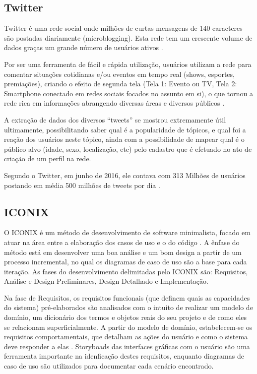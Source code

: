 \documentclass[
	12pt,				%
	openright,			%
	oneside,			%
	a4paper,			%
	english,			%
	spanish,			%
	brazil				%
	]{abntex2}
\begin{document}
	\subsection{Twitter}
	
	Twitter é uma rede social onde milhões de curtas mensagens de 140 caracteres são postadas diariamente (microblogging). Esta rede tem um crescente volume de dados graças um grande número de usuários ativos \cite{conference_twitter_alg}.

	Por ser uma ferramenta de fácil e rápida utilização, usuários utilizam a rede para comentar situações cotidianas e/ou eventos em tempo real (shows, esportes, premiações), criando o efeito de segunda tela (Tela 1: Evento ou TV, Tela 2: Smartphone conectado em redes sociais focados no assunto em si), o que tornou a rede rica em informações abrangendo diversas áreas e diversos públicos \cite{conference_twitter_sports}.

	A extração de dados dos diversos ``tweets'' se mostrou extremamente útil ultimamente, possibilitando saber qual é a popularidade de tópicos, e qual foi a reação dos usuários neste tópico,  ainda com a possibilidade de mapear qual é o público alvo (idade, sexo, localização, etc) pelo cadastro que é efetuado no ato de criação de um perfil na rede.

	Segundo o Twitter, em junho de 2016, ele contava com 313 Milhões de usuários \cite{twitter_company} postando em média 500 milhões de tweets por dia \cite{TwitterU87:online}.
	
	\subsection{ICONIX}	
	
	O ICONIX é um método de desenvolvimento de software minimalista, focado em atuar na área entre a elaboração dos casos de uso e o do código \cite{iconix}. A ênfase do método está em desenvolver uma boa análise e um bom design a partir de um processo incremental, no qual os diagramas de caso de uso são a base para cada iteração. As fases do desenvolvimento delimitadas pelo ICONIX são: Requisitos, Análise e Design Preliminares, Design Detalhado e Implementação.
	
	Na fase de Requisitos, os requisitos funcionais (que definem quais as capacidades do sistema) pré-elaborados são analisados com o intuito de realizar um modelo de domínio, um dicionário dos termos e objetos reais do seu projeto e de como eles se relacionam superficialmente. A partir do modelo de domínio, estabelecem-se os requisitos comportamentais, que detalham as ações do usuário e como o sistema deve responder a elas \cite{iconix}. Storyboads das interfaces gráficas com o usuário são uma ferramenta importante na idenficação destes requisitos, enquanto diagramas de caso de uso são utilizados para documentar cada cenário encontrado.
	
\end{document}
